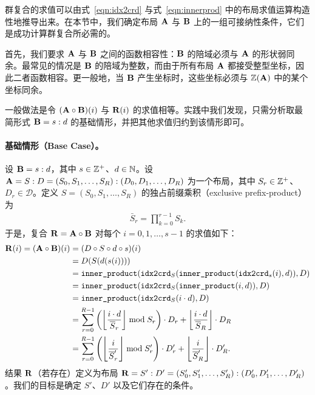 \label{sec:composition_impl}

群复合的求值可以由式~\eqref{eqn:idx2crd} 与式~\eqref{eqn:innerprod} 中的布局求值运算构造性地推导出来。在本节中，我们确定布局 $\mathbf{A}$ 与 $\mathbf{B}$ 上的一组可接纳性条件，它们是成功计算群复合所必需的。

首先，我们要求 $\mathbf{A}$ 与 $\mathbf{B}$ 之间的函数相容性：$\mathbf{B}$ 的陪域必须与 $\mathbf{A}$ 的形状弱同余。最常见的情况是 $\mathbf{B}$ 的陪域为整数，而由于所有布局 $\mathbf{A}$ 都接受整型坐标，因此二者函数相容。更一般地，当 $\mathbf{B}$ 产生坐标时，这些坐标必须与 $\mathbb{Z}(\mathbf{A})$ 中的某个坐标同余。

一般做法是令 $(\mathbf{A} \circ \mathbf{B})(i)$ 与 $\mathbf{R}(i)$ 的求值相等。实践中我们发现，只需分析取最简形式 $\mathbf{B} = s : d$ 的基础情形，并把其他求值归约到该情形即可。

\paragraph{基础情形（Base Case）。}

设 $\mathbf{B} = s : d$，其中 $s \in \mathbb{Z}^+$、$d \in \mathbb{N}$。设 $\mathbf{A} = S:D = (S_0, S_1, \ldots, S_R):(D_0, D_1, \ldots, D_R)$ 为一个布局，其中 $S_r \in \mathbb{Z}^+$、$D_r \in \mathcal{D}$。定义 $S = (S_0, S_1, \ldots, S_R)$ 的独占前缀乘积（exclusive prefix-product）为
\begin{align*}
\bar{S}_r = \prod_{k=0}^{r-1} S_k.
\end{align*}
于是，复合 $\mathbf{R} = \mathbf{A} \circ \mathbf{B}$ 对每个 $i = 0, 1, \ldots, s-1$ 的求值如下：
\begin{align}
\mathbf{R}(i) = (\mathbf{A} \circ \mathbf{B})(i) &= (D \circ S \circ d \circ s)(i) \nonumber \\
&= D(S(d(s(i)))) \nonumber\\
&= \texttt{inner\_product}(\texttt{idx2crd}_S(\texttt{inner\_product}(\texttt{idx2crd}_s(i), d)), D) \nonumber \\
&= \texttt{inner\_product}(\texttt{idx2crd}_S(\texttt{inner\_product}(i, d)), D) \nonumber \\
&= \texttt{inner\_product}(\texttt{idx2crd}_S(i \cdot d), D) \nonumber \\
&= \sum_{r=0}^{R-1} \left(\left\lfloor {\frac{i \cdot d}{\overline{S}_r}} \right\rfloor \bmod S_r\right) \cdot D_r + \left\lfloor {\frac{i \cdot d}{\overline{S}_R}} \right\rfloor \cdot D_R
\label{eqn:ABi} \\
&= \sum_{r=0}^{R-1} \left(\left\lfloor {\frac{i}{\overline{S}'_r}} \right\rfloor \bmod S'_r\right) \cdot D'_r + \left\lfloor {\frac{i}{\overline{S}'_R}} \right\rfloor \cdot D'_R. \nonumber
\end{align}
结果 $\mathbf{R}$（若存在）定义为布局 $\mathbf{R} = S':D' = (S'_0, S'_1, \ldots, S'_R):(D'_0, D'_1, \ldots, D'_R)$。我们的目标是确定 $S'$、$D'$ 以及它们存在的条件。

